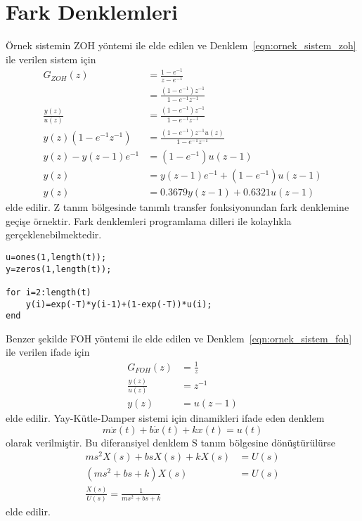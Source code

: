 \chapter{Fark Denklemleri}
Örnek sistemin ZOH yöntemi ile elde edilen ve Denklem~\ref{eqn:ornek_sistem_zoh} ile verilen sistem için
\begin{equation}
\begin{split}
    G_{ZOH}(z)&=\frac{1-e^{-1}}{z-e^{-1}}\\
    &=\frac{(1-e^{-1})z^{-1}}{1-e^{-1}z^{-1}}\\
    \frac{y(z)}{u(z)}&=\frac{(1-e^{-1})z^{-1}}{1-e^{-1}z^{-1}}\\
    y(z)(1-e^{-1}z^{-1})&=\frac{(1-e^{-1})z^{-1}u(z)}{1-e^{-1}z^{-1}}\\
    y(z)-y(z-1)e^{-1}&=(1-e^{-1})u(z-1)\\
    y(z)&=y(z-1)e^{-1}+(1-e^{-1})u(z-1)\\
    y(z)&=0.3679y(z-1)+0.6321u(z-1)
\end{split}
\end{equation}
elde edilir. Z tanım bölgesinde tanımlı transfer fonksiyonundan fark denklemine geçişe örnektir. Fark denklemleri programlama dilleri ile kolaylıkla gerçeklenebilmektedir.
\begin{lstlisting}
u=ones(1,length(t));
y=zeros(1,length(t));

for i=2:length(t)
    y(i)=exp(-T)*y(i-1)+(1-exp(-T))*u(i);
end\end{lstlisting}
Benzer şekilde FOH yöntemi ile elde edilen ve Denklem~\ref{eqn:ornek_sistem_foh} ile verilen ifade için
\begin{equation}
    \begin{split}
        G_{FOH}(z)&=\frac{1}{z}\\
        \frac{y(z)}{u(z)}&=z^{-1}\\
        y(z)&=u(z-1)
    \end{split}
\end{equation}
elde edilir.
Yay-Kütle-Damper sistemi için dinamikleri ifade eden denklem
\begin{equation}
    m\ddot{x}(t)+b\dot{x}(t)+kx(t)=u(t)
\end{equation}
olarak verilmiştir. Bu diferansiyel denklem S tanım bölgesine dönüştürülürse
\begin{equation}
\begin{split}
    ms^2X(s)+b sX(s)+kX(s)&=U(s)\\
    (ms^2+b s+k)X(s)&=U(s)\\
    \frac{X(s)}{U(s)}=\frac{1}{ms^2+b s+k}
\end{split}
\end{equation}
elde edilir.